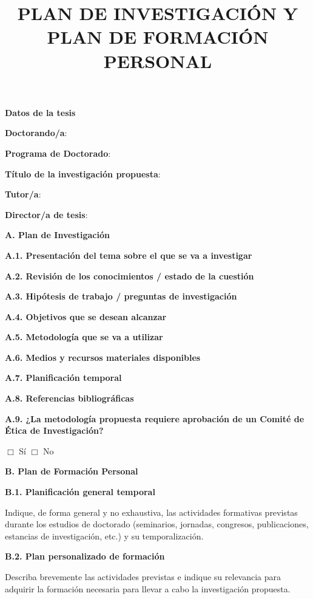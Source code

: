 \documentclass[11pt,a4paper,oneside]{article}
\title{PLAN DE INVESTIGACIÓN Y PLAN DE FORMACIÓN PERSONAL}
\date{}
\newcommand{\PhDFormSection}[1]{%
  \vspace{0.45cm}\noindent\textbf{\large #1}\par\smallskip}
\newcommand{\PhDFormField}[2]{%
  \noindent\textbf{#1}: #2\par}
\providecommand{\myPhDTutorFullName}{\myAcademicTutorFullName}
\begin{document}
\maketitle
\thispagestyle{empty}

\PhDFormSection{Datos de la tesis}
\PhDFormField{Doctorando/a}{\myAuthorFullName}
\PhDFormField{Programa de Doctorado}{\myPhDProgram}
\PhDFormField{Título de la investigación propuesta}{\myBookTitle}
\PhDFormField{Tutor/a}{\myPhDTutorFullName}
\PhDFormField{Director/a de tesis}{\myAcademicTutorFullName}
\ifthenelse{\equal{\myCoTutorFullName}{}}{}{\PhDFormField{Codirector/a de tesis}{\myCoTutorFullName}}

\PhDFormSection{A. Plan de Investigación}
\textbf{A.1. Presentación del tema sobre el que se va a investigar}\par
\vspace{2.2cm}
\textbf{A.2. Revisión de los conocimientos / estado de la cuestión}\par
\vspace{2.2cm}
\textbf{A.3. Hipótesis de trabajo / preguntas de investigación}\par
\vspace{1.8cm}
\textbf{A.4. Objetivos que se desean alcanzar}\par
\vspace{1.8cm}
\textbf{A.5. Metodología que se va a utilizar}\par
\vspace{2.2cm}
\textbf{A.6. Medios y recursos materiales disponibles}\par
\vspace{1.8cm}
\textbf{A.7. Planificación temporal}\par
\vspace{2.2cm}
\textbf{A.8. Referencias bibliográficas}\par
\vspace{2.2cm}
\textbf{A.9. ¿La metodología propuesta requiere aprobación de un Comité de Ética de Investigación?}\par
$\Box$ Sí \qquad $\Box$ No\par

\newpage
\PhDFormSection{B. Plan de Formación Personal}
\textbf{B.1. Planificación general temporal}\par
\smallskip
Indique, de forma general y no exhaustiva, las actividades formativas previstas durante los estudios de doctorado (seminarios, jornadas, congresos, publicaciones, estancias de investigación, etc.) y su temporalización.\par
\vspace{5cm}

\textbf{B.2. Plan personalizado de formación}\par
\smallskip
Describa brevemente las actividades previstas e indique su relevancia para adquirir la formación necesaria para llevar a cabo la investigación propuesta.\par
\vspace{6cm}
\end{document}
